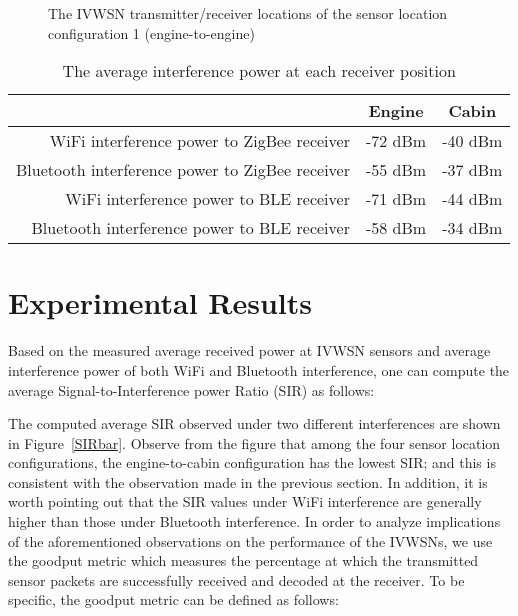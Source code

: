 \documentclass[journal]{IEEEtran}
\begin{document}
\begin{figure*}[tbp]
\centering
{}
\caption{The IVWSN transmitter/receiver locations of the sensor location configuration 1 (engine-to-engine)}
\label{CP2_NodeConf1}
\end{figure*}



\begin{table}[tbp]
  \centering
  \caption{The average interference power at each receiver position}
    \begin{tabular}{rcc}
    \toprule
          & Engine & Cabin \\
    \midrule
    WiFi interference power to ZigBee receiver & -72 dBm & -40 dBm \\
    Bluetooth interference power to ZigBee receiver & -55 dBm & -37 dBm \\
    WiFi interference power to BLE receiver & -71 dBm & -44 dBm \\
    Bluetooth interference power to BLE receiver & -58 dBm & -34 dBm \\
    \bottomrule
    \end{tabular}\label{Interference_power}\end{table}

\section{Experimental Results}




Based on the measured average received power at IVWSN sensors and average interference power of both WiFi and Bluetooth interference, one can compute the average Signal-to-Interference power Ratio (SIR) as follows:

The computed average SIR observed under two different interferences are shown in Figure~\ref{SIRbar}. Observe from the figure that among the four sensor location configurations, the engine-to-cabin configuration has the lowest SIR; and this is consistent with the observation made in the previous section. In addition, it is worth pointing out that the SIR values under WiFi interference are generally higher than those under Bluetooth interference. In order to analyze implications of the aforementioned observations on the performance of the IVWSNs, we use the goodput metric which measures the percentage at which the transmitted sensor packets are successfully received and decoded at the receiver. To be specific, the goodput metric can be defined as follows:
\end{document}
